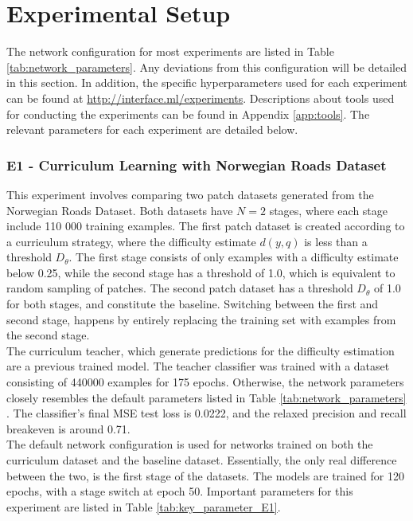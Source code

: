 \section{Experimental Setup}
\label{sec:experimentalSetup}
The network configuration for most experiments are listed in Table \ref{tab:network_parameters}. Any deviations from this configuration will be detailed in this section. In addition, the specific hyperparameters used for each experiment can be found at \url{http://interface.ml/experiments}. Descriptions about tools used for conducting the experiments can be found in Appendix \ref{app:tools}. The relevant parameters for each experiment are detailed below.\\ 

\subsubsection{E1 - Curriculum Learning with Norwegian Roads Dataset}
This experiment involves comparing two patch datasets generated from the Norwegian Roads Dataset. Both datasets have $N=2$ stages, where each stage include 110 000 training examples. The first patch dataset is created according to a curriculum strategy, where the difficulty estimate $d(y, q)$ is less than a threshold $D_\theta$. The first stage consists of only examples with a difficulty estimate below 0.25,  while the second stage has a threshold of 1.0, which is equivalent to random sampling of patches. The second patch dataset has a threshold $D_\theta$ of 1.0 for both stages, and constitute the baseline. Switching between the first and second stage, happens by entirely replacing the training set with examples from the second stage.\\

The curriculum teacher, which generate predictions for the difficulty estimation are a previous trained model. The teacher classifier was trained with a dataset consisting of 440000 examples for 175 epochs. Otherwise, the network parameters closely resembles the default parameters listed in Table \ref{tab:network_parameters} . The classifier's final \ac{MSE} test loss is 0.0222, and the relaxed precision and recall breakeven is around 0.71. \\

The default network configuration is used for networks trained on both the curriculum dataset and the baseline dataset. Essentially, the only real difference between the two, is the first stage of the datasets. The models are trained for 120 epochs, with a stage switch at epoch 50. Important parameters for this experiment are listed in Table \ref{tab:key_parameter_E1}.\\

